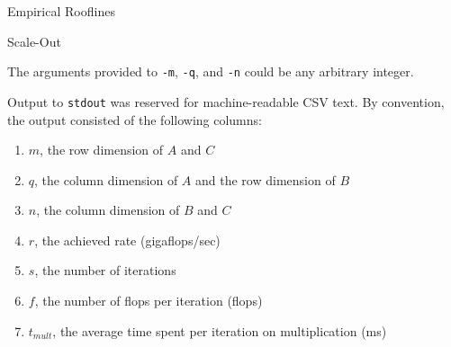 \documentclass{article}
\begin{document}
\begin{section}{Empirical Rooflines}
\begin{subsection}{Scale-Out}
    \begin{paragraph}{}
      The arguments provided to \texttt{-m}, \texttt{-q}, and \texttt{-n} could be any arbitrary integer.
    \end{paragraph}
    \begin{paragraph}{}
      Output to \texttt{stdout} was reserved for machine-readable CSV text. By convention, the output consisted of the following columns:
      \begin{enumerate}
      \item{$m$, the row dimension of $A$ and $C$}
      \item{$q$, the column dimension of $A$ and the row dimension of $B$}
      \item{$n$, the column dimension of $B$ and $C$}
      \item{$r$, the achieved rate (gigaflops/sec)}
      \item{$s$, the number of iterations}
      \item{$f$, the number of flops per iteration (flops)}
      \item{$t_{mult}$, the average time spent per iteration on multiplication (ms)}
      \end{enumerate}
    \end{paragraph}
  \end{subsection}
\end{section}
\end{document}
